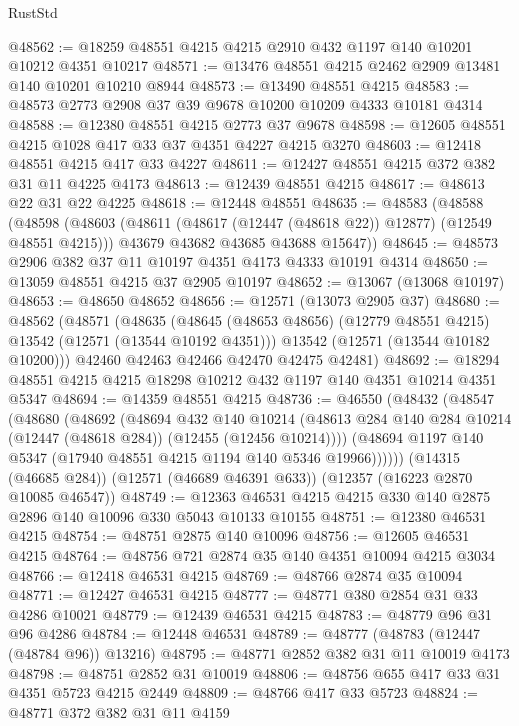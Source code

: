 \begin{lexlean}{RustStd}
\begin{coremodule}
@48562 := @18259 @48551 @4215 @4215 @2910 @432 @1197 @140 @10201 @10212 @4351 @10217
@48571 := @13476 @48551 @4215 @2462 @2909 @13481 @140 @10201 @10210 @8944
@48573 := @13490 @48551 @4215
@48583 := @48573 @2773 @2908 @37 @39 @9678 @10200 @10209 @4333 @10181 @4314
@48588 := @12380 @48551 @4215 @2773 @37 @9678
@48598 := @12605 @48551 @4215 @1028 @417 @33 @37 @4351 @4227 @4215 @3270
@48603 := @12418 @48551 @4215 @417 @33 @4227
@48611 := @12427 @48551 @4215 @372 @382 @31 @11 @4225 @4173
@48613 := @12439 @48551 @4215
@48617 := @48613 @22 @31 @22 @4225
@48618 := @12448 @48551
@48635 := @48583
    (@48588
      (@48598
        (@48603 (@48611 (@48617 (@12447 (@48618 @22)) @12877) (@12549 @48551 @4215)))
        @43679
        @43682
        @43685
        @43688
        @15647))
@48645 := @48573 @2906 @382 @37 @11 @10197 @4351 @4173 @4333 @10191 @4314
@48650 := @13059 @48551 @4215 @37 @2905 @10197
@48652 := @13067 (@13068 @10197)
@48653 := @48650 @48652
@48656 := @12571 (@13073 @2905 @37)
@48680 := @48562
    (@48571
      (@48635
        (@48645 (@48653 @48656) (@12779 @48551 @4215) @13542 (@12571 (@13544 @10192 @4351)))
        @13542
        (@12571 (@13544 @10182 @10200)))
      @42460
      @42463
      @42466
      @42470
      @42475
      @42481)
@48692 := @18294 @48551 @4215 @4215 @18298 @10212 @432 @1197 @140 @4351 @10214 @4351 @5347
@48694 := @14359 @48551 @4215
@48736 := @46550
    (@48432
      (@48547
        (@48680
          (@48692
            (@48694
              @432
              @140
              @10214
              (@48613 @284 @140 @284 @10214 (@12447 (@48618 @284)) (@12455 (@12456 @10214))))
            (@48694 @1197 @140 @5347 (@17940 @48551 @4215 @1194 @140 @5346 @19966))))))
    (@14315 (@46685 @284))
    (@12571 (@46689 @46391 @633))
    (@12357 (@16223 @2870 @10085 @46547))
@48749 := @12363 @46531 @4215 @4215 @330 @140 @2875 @2896 @140 @10096 @330 @5043 @10133 @10155
@48751 := @12380 @46531 @4215
@48754 := @48751 @2875 @140 @10096
@48756 := @12605 @46531 @4215
@48764 := @48756 @721 @2874 @35 @140 @4351 @10094 @4215 @3034
@48766 := @12418 @46531 @4215
@48769 := @48766 @2874 @35 @10094
@48771 := @12427 @46531 @4215
@48777 := @48771 @380 @2854 @31 @33 @4286 @10021
@48779 := @12439 @46531 @4215
@48783 := @48779 @96 @31 @96 @4286
@48784 := @12448 @46531
@48789 := @48777 (@48783 (@12447 (@48784 @96)) @13216)
@48795 := @48771 @2852 @382 @31 @11 @10019 @4173
@48798 := @48751 @2852 @31 @10019
@48806 := @48756 @655 @417 @33 @31 @4351 @5723 @4215 @2449
@48809 := @48766 @417 @33 @5723
@48824 := @48771
    @372
    @382
    @31
    @11
    @4159

\end{coremodule}
\end{lexlean}
